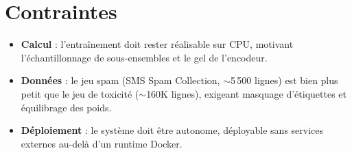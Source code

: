 \section{Contraintes}

\begin{itemize}[nosep]
  \item \textbf{Calcul} : l'entraînement doit rester réalisable sur CPU, motivant l'échantillonnage de sous-ensembles et le gel de l'encodeur.
  \item \textbf{Données} : le jeu spam (SMS Spam Collection, $\sim$5\,500 lignes) est bien plus petit que le jeu de toxicité ($\sim$160K lignes), exigeant masquage d'étiquettes et équilibrage des poids.
  \item \textbf{Déploiement} : le système doit être autonome, déployable sans services externes au-delà d'un runtime Docker.
\end{itemize}
